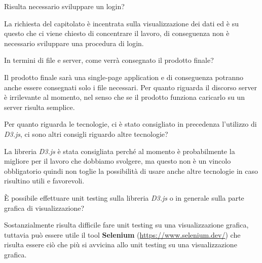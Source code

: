 \begin{itemize}
  \begin{minipage}[c]{0.47\textwidth}
  \centering
  Risulta necessario sviluppare un login?
  \end{minipage}
  \hfill
  \begin{minipage}[c]{0.47\textwidth}
  \centering
  La richiesta del capitolato è incentrata sulla visualizzazione dei dati ed è su questo che ci viene chiesto di concentrare il lavoro, di conseguenza non è necessario sviluppare una procedura di login.
  \end{minipage}

  \begin{spacing}{3}
  \end{spacing}

  \begin{minipage}[c]{0.47\textwidth}
  \centering
  In termini di file e server, come verrà consegnato il prodotto finale?
  \end{minipage}
  \hfill
  \begin{minipage}[c]{0.47\textwidth}
  \centering
  Il prodotto finale sarà una single-page application e di conseguenza potranno anche essere consegnati solo i file necessari. Per quanto riguarda il discorso server è irrilevante al momento, nel senso che se il prodotto funziona caricarlo su un server risulta semplice.
  \end{minipage}

  \begin{spacing}{3}
  \end{spacing}

  \begin{minipage}[c]{0.47\textwidth}
  \centering
  Per quanto riguarda le tecnologie, ci è stato consigliato in precedenza l'utilizzo di \textit{D3.js}, ci sono altri consigli riguardo altre tecnologie?
  \end{minipage}
  \hfill
  \begin{minipage}[c]{0.47\textwidth}
  \centering
  La libreria \textit{D3.js} è stata consigliata perché al momento è probabilmente la migliore per il lavoro che dobbiamo svolgere, ma questo non è un vincolo obbligatorio quindi non toglie la possibilità di usare anche altre tecnologie in caso risultino utili e favorevoli.
  \end{minipage}

  \begin{spacing}{3}
  \end{spacing}

  \begin{minipage}[c]{0.47\textwidth}
  \centering
  È possibile effettuare unit testing sulla libreria \textit{D3.js} o in generale sulla parte grafica di visualizzazione?
  \end{minipage}
  \hfill
  \begin{minipage}[c]{0.47\textwidth}
  \centering
  Sostanzialmente risulta difficile fare unit testing su una visualizzazione grafica, tuttavia può essere utile il tool \textbf{Selenium} (\url{https://www.selenium.dev/}) che risulta essere ciò che più si avvicina allo unit testing su una visualizzazione grafica.
  \end{minipage}

\end{itemize}
